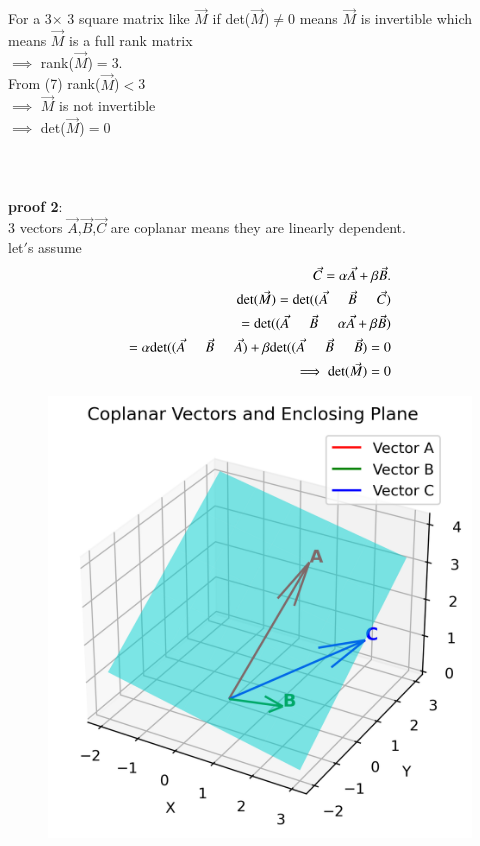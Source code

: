 \documentclass[journal]{IEEEtran}
\begin{document}
For a 3$\times$ 3  square matrix like $\Vec{M}$ if det($\Vec{M}$)$\neq$0 means $\Vec{M}$ is invertible which means $\Vec{M}$ is a full rank matrix\\ 
$\implies$ rank($\Vec{M}$)$=$3.\\ 
From (7) rank($\Vec{M}$)$<$3 \\
$\implies$ $\Vec{M}$ is not invertible\\
$\implies$ det($\Vec{M}$)$=$0\\ \\ \\  \\
\textbf{proof 2}:\\
 3 vectors $\Vec{A}$,$\Vec{B}$,$\Vec{C}$ are coplanar means they are linearly dependent.\\
 let$'$s assume
 \begin{align}
     \Vec{C}=\alpha \Vec{A}+\beta \Vec{B}.\\
     \text{det}(\Vec{M})=\text{det}((\Vec{A} \hspace{0.5cm} \Vec{B} \hspace{0.5cm} \Vec{C})\\
 =\text{det}((\Vec{A} \hspace{0.5cm} \Vec{B} \hspace{0.5cm} \alpha \Vec{A}+\beta \Vec{B})\\
 =\alpha \text{det}((\Vec{A} \hspace{0.5cm} \Vec{B} \hspace{0.5cm} \Vec{A}) + \beta \text{det}((\Vec{A} \hspace{0.5cm} \Vec{B} \hspace{0.5cm} \Vec{B})=0\\
 \implies \text{det}(\Vec{M})=0
 \end{align}

\begin{figure}[H]
    \centering
    \includegraphics[width=0.50\columnwidth]{figs/01.png}
    \label{fig-1}
\end{figure}
\end{document}
